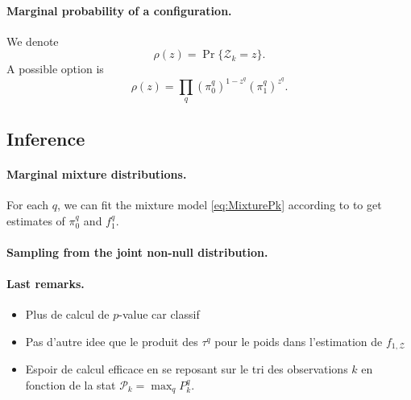 \documentclass[a4paper, 11pt]{article}
\newcommand{\Pcal}{\mathcal{P}}
\newcommand{\Zcal}{\mathcal{Z}}
\begin{document}
\paragraph{Marginal probability of a configuration.} We denote
$$
\rho(z) = \Pr\{\Zcal_k = z\}.
$$
A possible option is
$$
\rho(z) = \prod_q (\pi^q_0)^{1-z^q} (\pi^q_1)^{z^q}.
$$

\subsection{Inference}

\paragraph{Marginal mixture distributions.} For each $q$, we can fit the mixture model \eqref{eq:MixturePk} according to \cite{RBD07} to get estimates of $\pi^q_0$ and $f^q_1$.

\paragraph{Sampling from the joint non-null distribution.} 


\paragraph{Last remarks.} 
\begin{itemize}
 \item Plus de calcul de $p$-value car classif
 \item Pas d'autre idee que le produit des $\tau^q$ pour le poids dans l'estimation de $f_{1, \Zcal}$
 \item Espoir de calcul efficace en se reposant sur le tri des observations $k$ en fonction de la stat $\Pcal_k = \max_q P^q_k$.
\end{itemize}

\end{document}
